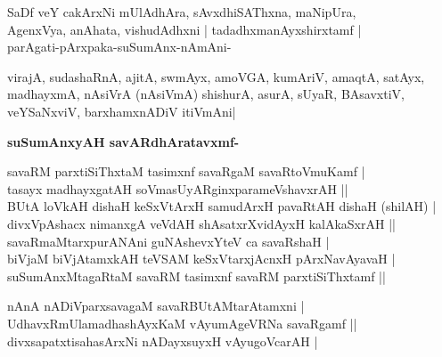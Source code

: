 \begin{artha}
SaDf veY cakArxNi mUlAdhAra, sAvxdhiSAThxna, maNipUra,\\
AgenxVya, anAhata, vishudAdhxni | tadadhxmanAyxshirxtamf |\\\label{154a}\label{155}
parAgati-pArxpaka-suSumAnx-nAmAni-
\end{artha}

\begin{artha}
virajA, sudashaRnA, ajitA, swmAyx, amoVGA, kumAriV, amaqtA, satAyx, madhayxmA, nAsiVrA (nAsiVmA) shishurA, asurA, sUyaR, BAsavxtiV, veYSaNxviV, barxhamxnADiV itiVmAni|
\end{artha}

\newpage

{\bigskip
\noindent
{\large\bf suSumAnxyAH savARdhAratavxmf-}}
\medskip

\begin{shloka}
savaRM parxtiSiThxtaM tasimxnf savaRgaM savaRtoVmuKamf |\\
tasayx madhayxgatAH soVmasUyARginxparameVshavxrAH ||\\
BUtA loVkAH dishaH keSxVtArxH samudArxH pavaRtAH dishaH (shilAH) |\\
divxVpAshacx nimanxgA veVdAH shAsatxrXvidAyxH kalAkaSxrAH ||\\
savaRmaMtarxpurANAni guNAshevxYteV ca savaRshaH |\\
biVjaM biVjAtamxkAH teVSAM keSxVtarxjAcnxH pArxNavAyavaH |\\
suSumAnxMtagaRtaM savaRM tasimxnf savaRM parxtiSiThxtamf ||
\end{shloka}


\begin{shloka}
nAnA nADiVparxsavagaM savaRBUtAMtarAtamxni |\\\label{155a}
UdhavxRmUlamadhashAyxKaM vAyumAgeVRNa savaRgamf ||\\
divxsapatxtisahasArxNi nADayxsuyxH vAyugoVcarAH |\label{155b}
\end{shloka}

